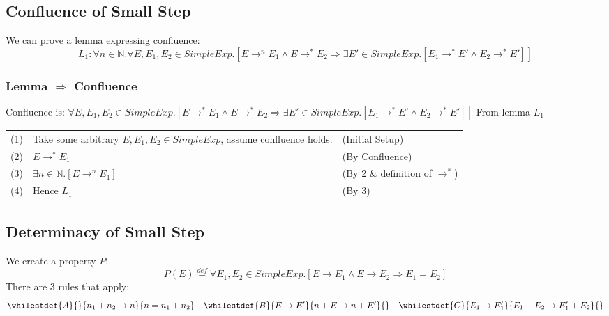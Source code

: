 \subsection{Confluence of Small Step}
We can prove a lemma expressing confluence:
\[L_1 : \forall n \in \mathbb{N} . \forall E, E_1, E_2 \in SimpleExp . [E \to^n E_1 \land E \to^* E_2 \Rightarrow \exists E' \in SimpleExp . [E_1 \to^* E' \land E_2 \to^* E']]\]
\subsubsection{Lemma $\Rightarrow$ Confluence}
Confluence is: $\forall E, E_1, E_2 \in SimpleExp . [E \to^* E_1 \land E \to^* E_2 \Rightarrow \exists E' \in SimpleExp . [E_1 \to^* E' \land E_2 \to^* E']]$
From lemma $L_1$
\begin{center}
	\begin{tabular}{l l l}
		(1) & Take some arbitrary $E, E_1, E_2 \in SimpleExp$, assume confluence holds. & (Initial Setup)                 \\
		(2) & $E \to^* E_1$                                                             & (By Confluence)                 \\
		(3) & $\exists n \in \mathbb{N} .[E \to^n E_1]$                                 & (By 2 \& definition of $\to^*$) \\
		(4) & Hence $L_1$                                                               & (By 3)                          \\
	\end{tabular}
\end{center}
\subsection{Determinacy of Small Step}
We create a property $P$:
\[P(E) \overset{def}{=} \forall E_1,E_2 \in SimpleExp .[E \to E_1 \land E \to E_2 \Rightarrow E_1 = E_2] \]
There are 3 rules that apply:
\[\begin{matrix}
		\whilestdef{A}{}{n_1 + n_2 \to n}{n = n_1 + n_2} & \whilestdef{B}{E \to E'}{n + E \to n + E'}{} & \whilestdef{C}{E_1 \to E_1'}{E_1 + E_2 \to E_1' + E_2}{}
	\end{matrix}\]
